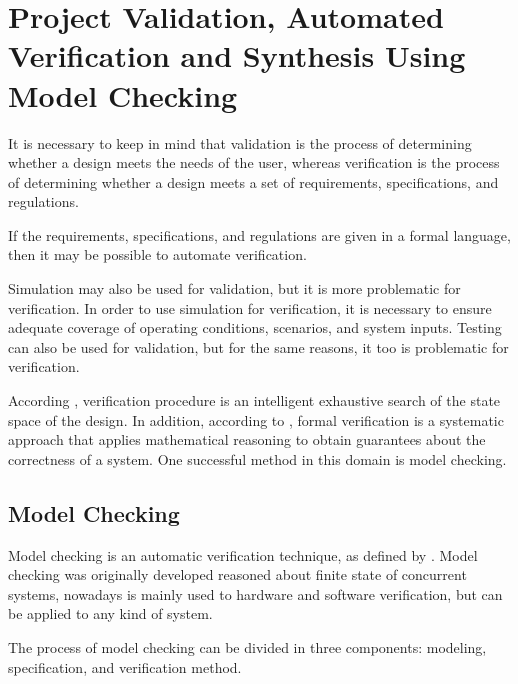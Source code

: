 \section{Project Validation, Automated Verification and Synthesis Using Model Checking}
\label{sec:AutomatedVerification}

It is necessary to keep in mind that validation is the process of determining whether a design meets the needs of the user, whereas verification is the process of determining whether a design meets a set of requirements, specifications, and regulations.  

If the requirements, specifications, and regulations are given in a formal language, then it may be possible to automate verification.  

Simulation may also be used for validation, but it is more problematic for verification. In order to use simulation for verification, it is necessary to ensure adequate coverage of operating conditions, scenarios, and system inputs. Testing can also be used for validation, but for the same reasons, it too is problematic for verification.
 
According \cite{Clarke2008}, verification procedure is an intelligent exhaustive search of the state space of the design. In addition, according to \cite{Forejt2011}, formal verification is a systematic approach that applies mathematical reasoning to obtain guarantees about the correctness of a system. One successful method in this domain is model checking.

\subsection{Model Checking}
  
Model checking is an automatic verification technique, as defined by \cite{Clarke2008}. Model checking was originally developed reasoned about finite state of concurrent systems, nowadays is mainly used to hardware and software verification, but can be applied to any kind of system. 

The process of model checking can be divided in three components: modeling, specification, and verification method. 

